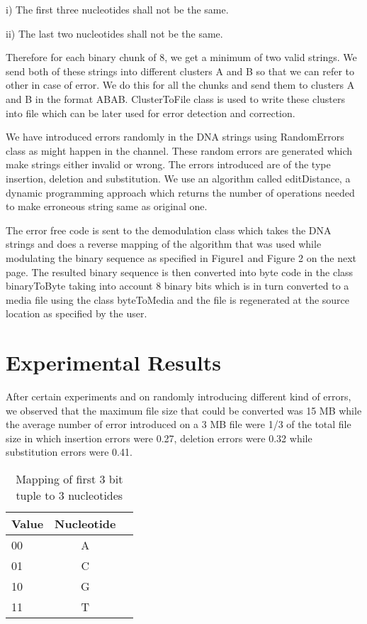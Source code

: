 \documentclass[twoside]{ASDJ}
\begin{document}
i) The first three nucleotides shall not be the same.

ii) The last two nucleotides shall not be the same.

Therefore for each binary chunk of 8, we get a minimum of two valid strings. We send both of these strings into different clusters A and B so that we can refer to other in case of error. We do this for all the chunks and send them to clusters A and B in the format ABAB. ClusterToFile class is used to write these clusters into file which can be later used for error detection and correction.


We have introduced errors randomly in the DNA strings using RandomErrors class as might happen in the channel. These random errors are generated which make strings either invalid or wrong. The errors introduced are of the type insertion, deletion and substitution. We use an algorithm called editDistance, a dynamic programming approach which returns the number of operations needed to make erroneous string same as original one.


The error free code is sent to the demodulation class which takes the DNA strings and does a reverse mapping of the algorithm that was used while modulating the binary sequence as specified in Figure1 and Figure 2 on the next page. The resulted binary sequence is then converted into byte code in the class binaryToByte taking into account 8 binary bits which is in turn converted to a media file using the class byteToMedia and the file is regenerated at the source location as specified by the user.

\section{Experimental Results}
After certain experiments and on randomly introducing different kind of errors, we observed that the maximum file size that could be converted was 15 MB while the average number of error introduced on a 3 MB file were 1/3 of the total file size in which insertion errors were 0.27, deletion errors were 0.32 while substitution errors were 0.41.


\begin{table}
\begin{tabular}{lcc}
  Value & Nucleotide \\
  \hline
  \hline
  00 & A \\
    01 & C \\
      10 & G \\
        11 & T \\
    \hline
\end{tabular}
\caption{Mapping of first 3 bit tuple to 3 nucleotides}
\end{table}
\end{document}
